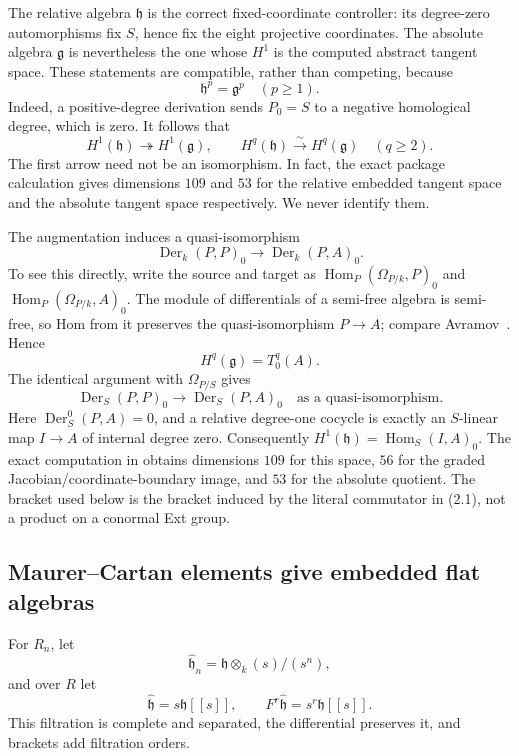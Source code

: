 \documentclass[11pt]{article}
\theoremstyle{definition}
\theoremstyle{remark}
\newcommand{\Der}{\operatorname{Der}}
\begin{document}
The relative algebra $\mathfrak h$ is the correct fixed-coordinate
controller: its degree-zero automorphisms fix $S$, hence fix the eight
projective coordinates.  The absolute algebra $\mathfrak g$ is nevertheless
the one whose $H^1$ is the computed abstract tangent space.  These statements
are compatible, rather than competing, because
\[
 \mathfrak h^p=\mathfrak g^p\quad(p\geq1).                   \tag{2.2}
\]
Indeed, a positive-degree derivation sends $P_0=S$ to a negative homological
degree, which is zero.  It follows that
\[
 H^1(\mathfrak h)\twoheadrightarrow H^1(\mathfrak g),
 \qquad H^q(\mathfrak h)\xrightarrow{\sim}H^q(\mathfrak g)
 \quad(q\geq2).                                              \tag{2.3}
\]
The first arrow need not be an isomorphism.  In fact, the exact package
calculation gives dimensions $109$ and $53$ for the relative embedded
tangent space and the absolute tangent space respectively.  We never identify
them.

The augmentation induces a quasi-isomorphism
\[
 \Der_k(P,P)_0\longrightarrow\Der_k(P,A)_0.                 \tag{2.4}
\]
To see this directly, write the source and target as
$\operatorname{Hom}_P(\Omega_{P/k},P)_0$ and
$\operatorname{Hom}_P(\Omega_{P/k},A)_0$.  The module of differentials of a
semi-free algebra is semi-free, so Hom from it preserves the quasi-isomorphism
$P\to A$; compare Avramov~\cite[Corollary 6.2.4]{Avramov}.  Hence
\[
 H^q(\mathfrak g)=T^q_0(A).                                  \tag{2.5}
\]
The identical argument with $\Omega_{P/S}$ gives
\[
 \Der_S(P,P)_0\longrightarrow\Der_S(P,A)_0
\quad\text{as a quasi-isomorphism}.                          \tag{2.6}
\]
Here $\Der_S^0(P,A)=0$, and a relative degree-one cocycle is exactly an
$S$-linear map $I\to A$ of internal degree zero.  Consequently
$H^1(\mathfrak h)=\operatorname{Hom}_S(I,A)_0$.  The exact computation in
 obtains dimensions $109$ for this
space, $56$ for the graded Jacobian/coordinate-boundary image, and $53$ for
the absolute quotient.
The bracket used below is the bracket induced by the literal commutator in
(2.1), not a product on a conormal Ext group.

\subsection{Maurer--Cartan elements give embedded flat algebras}

For $R_n$, let
\[
 \widehat{\mathfrak h}_n
 =\mathfrak h\otimes_k(s)/(s^n),
\]
and over $R$ let
\[
 \widehat{\mathfrak h}=s\mathfrak h[[s]],
 \qquad F^r\widehat{\mathfrak h}=s^r\mathfrak h[[s]].       \tag{2.7}
\]
This filtration is complete and separated, the differential preserves it,
and brackets add filtration orders.
\end{document}
